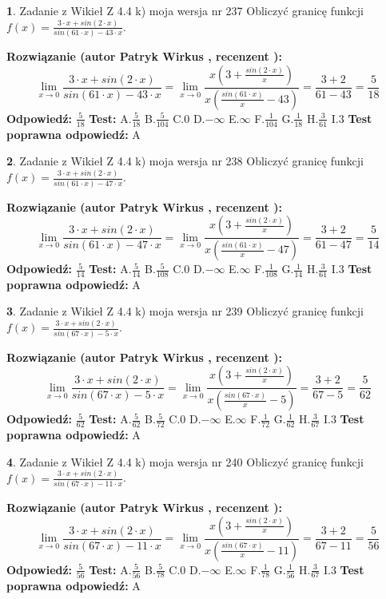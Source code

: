 \documentclass[12pt, a4paper]{article}
\theoremstyle{definition} %
\newtheorem{zad}{}
\newcommand{\zadStart}[1]{\begin{zad}#1\newline}
\newcommand{\zadStop}{\end{zad}}
\newcommand{\rozwStart}[2]{\noindent \textbf{Rozwiązanie (autor #1 , recenzent #2): }\newline}
\newcommand{\rozwStop}{\newline}
\newcommand{\odpStart}{\noindent \textbf{Odpowiedź:}\newline}
\newcommand{\odpStop}{\newline}
\newcommand{\testStart}{\noindent \textbf{Test:}\newline}
\newcommand{\testStop}{\newline}
\newcommand{\kluczStart}{\noindent \textbf{Test poprawna odpowiedź:}\newline}
\newcommand{\kluczStop}{\newline}
\begin{document}
\zadStart{Zadanie z Wikieł Z 4.4 k) moja wersja nr 237}
Obliczyć granicę funkcji $f(x)=\frac{3\cdot x +sin(2\cdot x)}{sin(61\cdot x) -43\cdot x}$.
\zadStop
\rozwStart{Patryk Wirkus}{}
$$\lim\limits_{x\to 0}\frac{3\cdot x +sin(2\cdot x)}{sin(61\cdot x) -43\cdot x}
=\lim\limits_{x\to 0}\frac{x(3+\frac{sin(2\cdot x)}{x})}{x(\frac{sin(61\cdot x)}{x}-43)}
=\frac{3+2}{61-43} = \frac{5}{18}$$
\rozwStop
\odpStart
$\frac{5}{18}$
\odpStop
\testStart
A.$\frac{5}{18}$
B.$\frac{5}{104}$
C.$0$
D.$-\infty$
E.$\infty$
F.$\frac{1}{104}$
G.$\frac{1}{18}$
H.$\frac{3}{61}$
I.$3$
\testStop
\kluczStart
A
\kluczStop



\zadStart{Zadanie z Wikieł Z 4.4 k) moja wersja nr 238}
Obliczyć granicę funkcji $f(x)=\frac{3\cdot x +sin(2\cdot x)}{sin(61\cdot x) -47\cdot x}$.
\zadStop
\rozwStart{Patryk Wirkus}{}
$$\lim\limits_{x\to 0}\frac{3\cdot x +sin(2\cdot x)}{sin(61\cdot x) -47\cdot x}
=\lim\limits_{x\to 0}\frac{x(3+\frac{sin(2\cdot x)}{x})}{x(\frac{sin(61\cdot x)}{x}-47)}
=\frac{3+2}{61-47} = \frac{5}{14}$$
\rozwStop
\odpStart
$\frac{5}{14}$
\odpStop
\testStart
A.$\frac{5}{14}$
B.$\frac{5}{108}$
C.$0$
D.$-\infty$
E.$\infty$
F.$\frac{1}{108}$
G.$\frac{1}{14}$
H.$\frac{3}{61}$
I.$3$
\testStop
\kluczStart
A
\kluczStop



\zadStart{Zadanie z Wikieł Z 4.4 k) moja wersja nr 239}
Obliczyć granicę funkcji $f(x)=\frac{3\cdot x +sin(2\cdot x)}{sin(67\cdot x) -5\cdot x}$.
\zadStop
\rozwStart{Patryk Wirkus}{}
$$\lim\limits_{x\to 0}\frac{3\cdot x +sin(2\cdot x)}{sin(67\cdot x) -5\cdot x}
=\lim\limits_{x\to 0}\frac{x(3+\frac{sin(2\cdot x)}{x})}{x(\frac{sin(67\cdot x)}{x}-5)}
=\frac{3+2}{67-5} = \frac{5}{62}$$
\rozwStop
\odpStart
$\frac{5}{62}$
\odpStop
\testStart
A.$\frac{5}{62}$
B.$\frac{5}{72}$
C.$0$
D.$-\infty$
E.$\infty$
F.$\frac{1}{72}$
G.$\frac{1}{62}$
H.$\frac{3}{67}$
I.$3$
\testStop
\kluczStart
A
\kluczStop



\zadStart{Zadanie z Wikieł Z 4.4 k) moja wersja nr 240}
Obliczyć granicę funkcji $f(x)=\frac{3\cdot x +sin(2\cdot x)}{sin(67\cdot x) -11\cdot x}$.
\zadStop
\rozwStart{Patryk Wirkus}{}
$$\lim\limits_{x\to 0}\frac{3\cdot x +sin(2\cdot x)}{sin(67\cdot x) -11\cdot x}
=\lim\limits_{x\to 0}\frac{x(3+\frac{sin(2\cdot x)}{x})}{x(\frac{sin(67\cdot x)}{x}-11)}
=\frac{3+2}{67-11} = \frac{5}{56}$$
\rozwStop
\odpStart
$\frac{5}{56}$
\odpStop
\testStart
A.$\frac{5}{56}$
B.$\frac{5}{78}$
C.$0$
D.$-\infty$
E.$\infty$
F.$\frac{1}{78}$
G.$\frac{1}{56}$
H.$\frac{3}{67}$
I.$3$
\testStop
\kluczStart
A
\kluczStop
\end{document}
